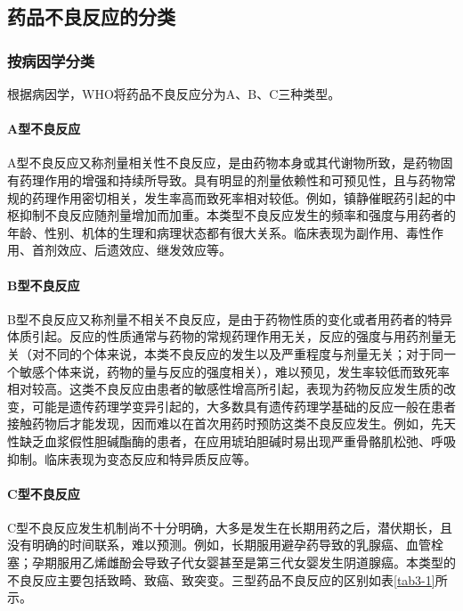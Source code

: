 \subsection{药品不良反应的分类}

\subsubsection{按病因学分类}

根据病因学，WHO将药品不良反应分为A、B、C三种类型。
\paragraph{A型不良反应}

A型不良反应又称剂量相关性不良反应，是由药物本身或其代谢物所致，是药物固有药理作用的增强和持续所导致。具有明显的剂量依赖性和可预见性，且与药物常规的药理作用密切相关，发生率高而致死率相对较低。例如，镇静催眠药引起的中枢抑制不良反应随剂量增加而加重。本类型不良反应发生的频率和强度与用药者的年龄、性别、机体的生理和病理状态都有很大关系。临床表现为副作用、毒性作用、首剂效应、后遗效应、继发效应等。
\paragraph{B型不良反应}

B型不良反应又称剂量不相关不良反应，是由于药物性质的变化或者用药者的特异体质引起。反应的性质通常与药物的常规药理作用无关，反应的强度与用药剂量无关（对不同的个体来说，本类不良反应的发生以及严重程度与剂量无关；对于同一个敏感个体来说，药物的量与反应的强度相关），难以预见，发生率较低而致死率相对较高。这类不良反应由患者的敏感性增高所引起，表现为药物反应发生质的改变，可能是遗传药理学变异引起的，大多数具有遗传药理学基础的反应一般在患者接触药物后才能发现，因而难以在首次用药时预防这类不良反应发生。例如，先天性缺乏血浆假性胆碱酯酶的患者，在应用琥珀胆碱时易出现严重骨骼肌松弛、呼吸抑制。临床表现为变态反应和特异质反应等。
\paragraph{C型不良反应}

C型不良反应发生机制尚不十分明确，大多是发生在长期用药之后，潜伏期长，且没有明确的时间联系，难以预测。例如，长期服用避孕药导致的乳腺癌、血管栓塞；孕期服用乙烯雌酚会导致子代女婴甚至是第三代女婴发生阴道腺癌。本类型的不良反应主要包括致畸、致癌、致突变。三型药品不良反应的区别如表\ref{tab3-1}所示。

